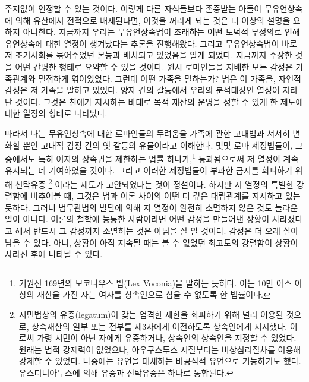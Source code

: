 주저없이 인정할 수 있는 것이다.
이렇게 다른 자식들보다 존중받는 아들이 무유언상속에 의해
유산에서 전적으로 배제된다면,
이것을 꺼리게 되는 것은 더 이상의 설명을 요하지 아니한다.
지금까지
우리는
무유언상속법이 초래하는 어떤 도덕적 부정의로 인해
유언상속에 대한 열정이 생겨났다는 추론을 진행해왔다.
그리고 무유언상속법이 바로 저 초기사회를 묶어주었던 본능과
배치되고 있었음을 알게 되었다.
지금까지 주장한 것을 어떤 간명한 행태로 요약할 수 있을 것이다.
원시 로마인들을 지배한 모든 감정은
가족관계와 밀접하게 엮여있었다.
그런데 어떤 가족을 말하는가?
법은 이 가족을, 자연적 감정은 저 가족을 말하고 있었다.
양자 간의 갈등에서 우리의 분석대상인 열정이 자라난 것이다.
그것은
친애가 지시하는 바대로 목적 재산의 운명을 정할 수 있게 한 제도에 대한 열정의
형태로 나타났다.

따라서 나는 무유언상속에 대한 로마인들의 두려움을
가족에 관한 고대법과 서서히 변화할 뿐인 고대적 감정 간의 옛 갈등의 유물이라고
이해한다.
몇몇 로마 제정법들이, 그중에서도 특히
여자의 상속권을 제한하는 법률 하나가,\footnote{%
  기원전 169년의 보코니우스 법(Lex Voconia)을 말하는 듯하다.
  이는 10만 아스 이상의 재산을 가진 자는 여자를 상속인으로 삼을 수
  없도록 한 법률이다. }
통과됨으로써
저 열정이 계속 유지되는 데 기여하였을 것이다.
그리고 이러한 제정법들이 부과한 금지를 회피하기 위해
신탁유증%
\footnote{시민법상의 유증(legatum)이 갖는 엄격한 제한을 회피하기 위해
  널리 이용된 것으로, 상속재산의 일부 또는 전부를 제3자에게 이전하도록
  상속인에게 지시했다.
  이로써 가령 시민이 아닌 자에게 유증하거나,
  상속인의 상속인을 지정할 수 있었다.
  원래는 법적 강제력이 없었으나,
  아우구스투스 시절부터는 비상심리절차를 이용해 강제할 수 있었다.
  나중에는 유언을 대체하는 비공식적 유언으로 기능하기도 했다.
  유스티니아누스에 의해 유증과 신탁유증은 하나로 통합된다. }%
이라는 제도가 고안되었다는 것이 정설이다.
하지만 저 열정의 특별한 강렬함에 비추어볼 때,
그것은 법과 여론 사이의 어떤 더 깊은 대립관계를 지시하고 있는 듯하다.
그러니 법무관법의 발달에 의해 저 열정이 완전히 소멸하지 않은 것도
놀라운 일이 아니다.
여론의 철학에 능통한 사람이라면
어떤 감정을 만들어낸 상황이 사라졌다고 해서 반드시
그 감정까지 소멸하는 것은 아님을 잘 알 것이다.
감정은 더 오래 살아남을 수 있다.
아니, 상황이 아직 지속될 때는 볼 수 없었던 최고도의 강렬함이
상황이 사라진 후에 나타날 수 있다.

